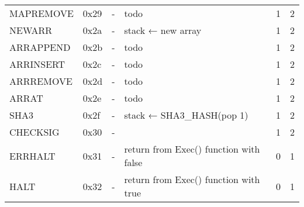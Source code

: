 \begin{longtable}[c]{L{2.5cm} L{1cm} L{3cm} L{5.5cm} R{0.8cm} R{1cm} }
MAPREMOVE & 0x29   & -                                                                                                        & todo                                                                                                        & 1         & 2          \\
NEWARR    & 0x2a   & -                                                                                                        & stack ← new array                                                                                           & 1         & 2          \\
ARRAPPEND & 0x2b   & -                                                                                                        & todo                                                                                                        & 1         & 2          \\
ARRINSERT & 0x2c   & -                                                                                                        & todo                                                                                                        & 1         & 2          \\
ARRREMOVE & 0x2d   & -                                                                                                        & todo                                                                                                        & 1         & 2          \\
ARRAT     & 0x2e   & -                                                                                                        & todo                                                                                                        & 1         & 2          \\
SHA3      & 0x2f   & -                                                                                                        & stack ← SHA3\_HASH(pop 1)                                                                                   & 1         & 2          \\
CHECKSIG  & 0x30   & -                                                                                                        &                                                                                                             & 1         & 2          \\
ERRHALT   & 0x31   & -                                                                                                        & return from Exec() function with false                                                                      & 0         & 1          \\
HALT      & 0x32   & -                                                                                                        & return from Exec() function with true                                                                       & 0         & 1          \\* \bottomrule
\end{longtable}